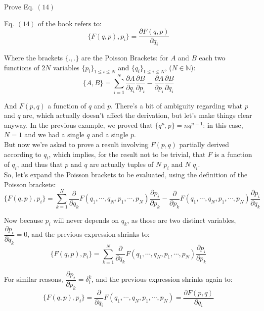 \documentclass[solutions.tex]{subfiles}
\begin{document}
\maketitle
\begin{exercise}
Prove Eq. $(14)$
\end{exercise}

Eq. $(14)$ of the book refers to:
\[
	\{F(q,p),p_i\} = \frac{\partial F(q, p)}{\partial q_i}
\]

Where the brackets $\{ ., . \}$ are the Poisson Brackets: for
$A$ and $B$ each two functions of $2N$ variables $\{p_i\}_{1\leq i \leq N}$
and $\{q_i\}_{1\leq i \leq N}$, ($N\in\mathbb{N}$):
\[
	\{A, B\} = \sum_{i=1}^N
		\frac{\partial A}{\partial q_i}
			\frac{\partial B}{\partial p_i}
		-\frac{\partial A}{\partial p_i}
			\frac{\partial B}{\partial q_i}
\]

And $F(p, q)$ a function of $q$ and $p$. There's a bit of ambiguity
regarding what $p$ and $q$ are, which actually doesn't affect the derivation,
but let's make things clear anyway. In the
previous example, we proved that $\{q^n, p\}=nq^{n-1}$: in
this case, $N=1$ and we had a single $q$ and a single $p$. \\

But now we're asked to prove a result involving $F(p, q)$
partially derived according to $q_i$, which implies, for the result
not to be trivial, that $F$ is a function of $q_i$, and thus
that $p$ and $q$ are actually tuples of $N$ $p_i$ and $N$ $q_i$. \\

So, let's expand the Poisson brackets to be evaluated, using the definition
of the Poisson brackets:
\[
	\{F(q,p),p_i\} = \sum_{k=1}^N
		\frac{\partial}{\partial q_k}F(q_1, \cdots, q_N, p_1, \cdots, p_N)
		\frac{\partial p_i}{\partial p_k}
		- \frac{\partial}{\partial p_k}F(q_1, \cdots, q_N, p_1, \cdots, p_N)
		\frac{\partial p_i}{\partial q_k}
\]

Now because $p_i$ will never depends on $q_k$, as those are two distinct variables,
$\dfrac{\partial p_i}{\partial q_k} = 0$, and the previous expression shrinks
to:
\[
	\{F(q,p),p_i\} = \sum_{k=1}^N
		\frac{\partial}{\partial q_k}F(q_1, \cdots, q_N, p_1, \cdots, p_N)
		\frac{\partial p_i}{\partial p_k}
\]

For similar reasons, $\dfrac{\partial p_i}{\partial p_k} = \delta_i^k$,
and the previous expression shrinks again to:
\[
	\{F(q,p),p_i\} =
		\frac{\partial}{\partial q_i}F(q_1, \cdots, q_N, p_1, \cdots, p_N)
			= \boxed{\frac{\partial F(p, q)}{\partial q_i}}
\]
\end{document}
